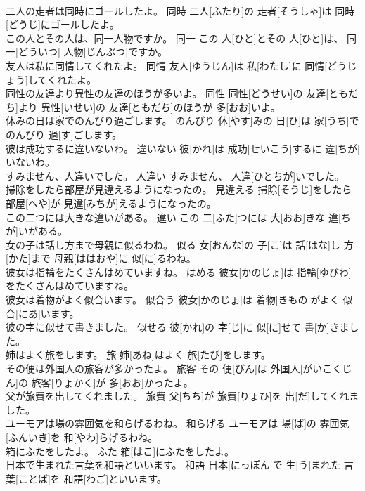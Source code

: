 \documentclass[8pt]{extreport}
\begin{document}
\begin{CJK}{UTF8}{min}
\\	二人の走者は同時にゴールしたよ。	同時	二人[ふたり]の 走者[そうしゃ]は 同時[どうじ]にゴールしたよ。	
\\	この人とその人は、同一人物ですか。	同一	この 人[ひと]とその 人[ひと]は、 同一[どういつ] 人物[じんぶつ]ですか。	
\\	友人は私に同情してくれたよ。	同情	友人[ゆうじん]は 私[わたし]に 同情[どうじょう]してくれたよ。	
\\	同性の友達より異性の友達のほうが多いよ。	同性	同性[どうせい]の 友達[ともだち]より 異性[いせい]の 友達[ともだち]のほうが 多[おお]いよ。	
\\	休みの日は家でのんびり過ごします。	のんびり	休[やす]みの 日[ひ]は 家[うち]でのんびり 過[す]ごします。	
\\	彼は成功するに違いないわ。	違いない	彼[かれ]は 成功[せいこう]するに 違[ちが]いないわ。	
\\	すみません、人違いでした。	人違い	すみません、 人違[ひとちが]いでした。	
\\	掃除をしたら部屋が見違えるようになったの。	見違える	掃除[そうじ]をしたら 部屋[へや]が 見違[みちが]えるようになったの。	
\\	この二つには大きな違いがある。	違い	この 二[ふた]つには 大[おお]きな 違[ちが]いがある。	
\\	女の子は話し方まで母親に似るわね。	似る	女[おんな]の 子[こ]は 話[はな]し 方[かた]まで 母親[ははおや]に 似[に]るわね。	
\\	彼女は指輪をたくさんはめていますね。	はめる	彼女[かのじょ]は 指輪[ゆびわ]をたくさんはめていますね。	
\\	彼女は着物がよく似合います。	似合う	彼女[かのじょ]は 着物[きもの]がよく 似合[にあ]います。	
\\	彼の字に似せて書きました。	似せる	彼[かれ]の 字[じ]に 似[に]せて 書[か]きました。	
\\	姉はよく旅をします。	旅	姉[あね]はよく 旅[たび]をします。	
\\	その便は外国人の旅客が多かったよ。	旅客	その 便[びん]は 外国人[がいこくじん]の 旅客[りょかく]が 多[おお]かったよ。	
\\	父が旅費を出してくれました。	旅費	父[ちち]が 旅費[りょひ]を 出[だ]してくれました。	
\\	ユーモアは場の雰囲気を和らげるわね。	和らげる	ユーモアは 場[ば]の 雰囲気[ふんいき]を 和[やわ]らげるわね。	
\\	箱にふたをしたよ。	ふた	箱[はこ]にふたをしたよ。	
\\	日本で生まれた言葉を和語といいます。	和語	日本[にっぽん]で 生[う]まれた 言葉[ことば]を 和語[わご]といいます。	

\end{CJK}
\end{document}
